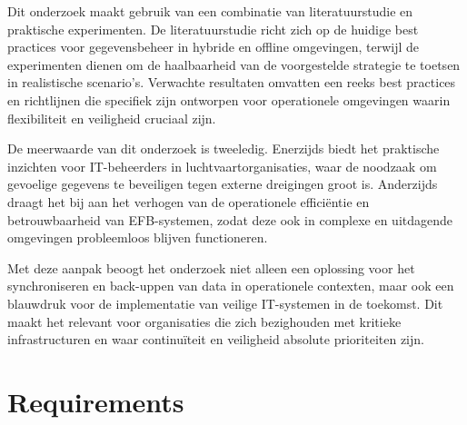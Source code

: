\documentclass[dutch,dit,thesis]{hogentreport}
\begin{document}
Dit onderzoek maakt gebruik van een combinatie van literatuurstudie en praktische experimenten. De literatuurstudie richt zich op de huidige best practices voor gegevensbeheer in hybride en offline omgevingen, terwijl de experimenten dienen om de haalbaarheid van de voorgestelde strategie te toetsen in realistische scenario's. Verwachte resultaten omvatten een reeks best practices en richtlijnen die specifiek zijn ontworpen voor operationele omgevingen waarin flexibiliteit en veiligheid cruciaal zijn.

De meerwaarde van dit onderzoek is tweeledig. Enerzijds biedt het praktische inzichten voor IT-beheerders in luchtvaartorganisaties, waar de noodzaak om gevoelige gegevens te beveiligen tegen externe dreigingen groot is. Anderzijds draagt het bij aan het verhogen van de operationele efficiëntie en betrouwbaarheid van EFB-systemen, zodat deze ook in complexe en uitdagende omgevingen probleemloos blijven functioneren.

Met deze aanpak beoogt het onderzoek niet alleen een oplossing voor het synchroniseren en back-uppen van data in operationele contexten, maar ook een blauwdruk voor de implementatie van veilige IT-systemen in de toekomst. Dit maakt het relevant voor organisaties die zich bezighouden met kritieke infrastructuren en waar continuïteit en veiligheid absolute prioriteiten zijn.




%

\chapter{Requirements}
\label{ch:requirements}



\backmatter{}

\setlength\bibitemsep{2pt} %
\printbibliography[heading=bibintoc]
\end{document}
